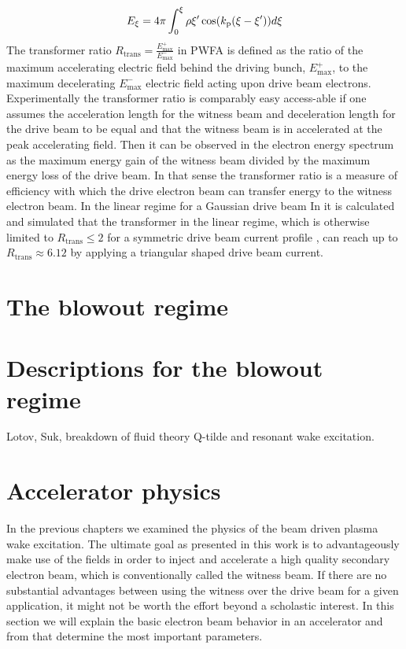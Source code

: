 \begin{equation}
E_\xi=4\pi \int_0^\xi \rho{\xi'}\cos(k_\mathrm{p}(\xi-\xi'))d\xi
\end{equation}
The transformer ratio $R_\mathrm{trans}=\frac{E_\mathrm{max}^+}{E_\mathrm{max}^-} $ in PWFA is defined as
the ratio of the maximum accelerating electric field
behind the driving bunch, $E_\mathrm{max}^+$, to the maximum decelerating $E_\mathrm{max}^-$
electric field acting upon drive beam electrons. Experimentally the transformer ratio is comparably easy access-able if one assumes the acceleration length for the witness beam and deceleration length for the drive beam to be equal and that the  witness beam is in accelerated at the peak accelerating field.
Then it can be observed in the electron energy spectrum as the maximum energy gain of the witness beam divided by the maximum energy loss of the drive beam. In that sense the transformer ratio is a measure of efficiency with which the drive electron beam can transfer energy to the witness electron beam. 
In the linear regime for a Gaussian drive beam 
In \cite{PhysRevLett.56.1252} it is calculated and simulated that the transformer in the linear regime, which is otherwise limited to $R_\mathrm{trans}\leq 2$ for a symmetric drive beam current profile \cite{bane1984wake}, can reach up to $R_\mathrm{trans}\approx 6.12$ by applying a triangular shaped drive beam current.
\section{The blowout regime}
\label{sec:Blowout_regime}
\section{Descriptions for the blowout regime}
Lotov, Suk, breakdown of fluid theory
Q-tilde and resonant wake excitation.


\section{Accelerator physics}
In the previous chapters we examined the physics of the beam driven plasma wake excitation. 
The ultimate goal as presented in this work is to advantageously make use of the fields in order to inject and accelerate a high quality secondary electron beam, which is conventionally called the witness beam. If there are no substantial advantages between  using the witness over the drive beam for a given application, it might not be worth the effort beyond a scholastic interest.
In this section we will explain the basic electron beam behavior in an accelerator and from that determine the most important parameters. 
